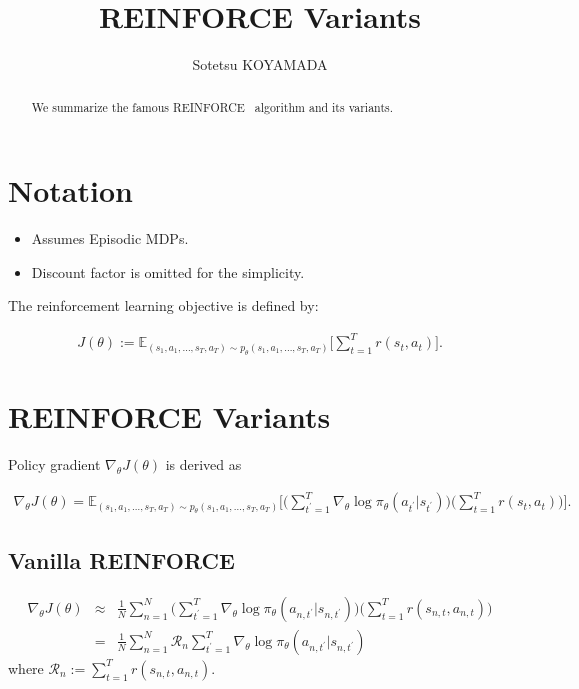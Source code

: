 \documentclass{article}
\title{REINFORCE Variants}
\author{
Sotetsu KOYAMADA
}
\begin{document}
\maketitle

\tableofcontents

\begin{abstract}
We summarize the famous REINFORCE~\citep{Williams1992-rp} algorithm and its variants.
\end{abstract}

\section{Notation}

\begin{itemize}
	\item Assumes Episodic MDPs.
	\item Discount factor is omitted for the simplicity.
\end{itemize}

The reinforcement learning objective is defined by:

\begin{eqnarray}
J(\theta) := \mathbb{E}_{(s_1, a_1, \ldots, s_T, a_T) \sim p_\theta(s_1, a_1, \ldots, s_T, a_T)} \Biggl[ \sum_{t=1}^{T} r(s_t, a_t) \Biggr].
\end{eqnarray}

\section{REINFORCE Variants}

Policy gradient $\nabla_\theta J(\theta)$ is derived as

\begin{eqnarray}
\nabla_\theta J(\theta)
= \mathbb{E}_{(s_1, a_1, \ldots, s_T, a_T) \sim p_\theta(s_1, a_1, \ldots, s_T, a_T)} \Biggl[ \Biggl(\sum_{t^\prime=1}^{T} \nabla_\theta \log \pi_\theta (a_{t^\prime}|s_{t^\prime}) \Biggr) \Biggl( \sum_{t=1}^T r(s_t, a_t) \Biggr) \Biggr].
\end{eqnarray}

\subsection{Vanilla REINFORCE}

\begin{eqnarray}
\nabla_\theta J(\theta)
&\approx& \frac{1}{N} \sum_{n=1}^{N} \Biggl( \sum_{t^\prime=1}^{T} \nabla_\theta \log \pi_\theta (a_{n, t^\prime}|s_{n, t^\prime}) \Biggr) \Biggl( \sum_{t=1}^T r(s_{n, t}, a_{n, t}) \Biggr) \\
&=& \frac{1}{N} \sum_{n=1}^{N} \mathcal{R}_n \sum_{t^\prime=1}^{T} \nabla_\theta \log \pi_\theta (a_{n, t^\prime}|s_{n, t^\prime})
\end{eqnarray}
where $\mathcal{R}_{n} := \sum_{t=1}^T r(s_{n, t}, a_{n, t})$.
\end{document}
